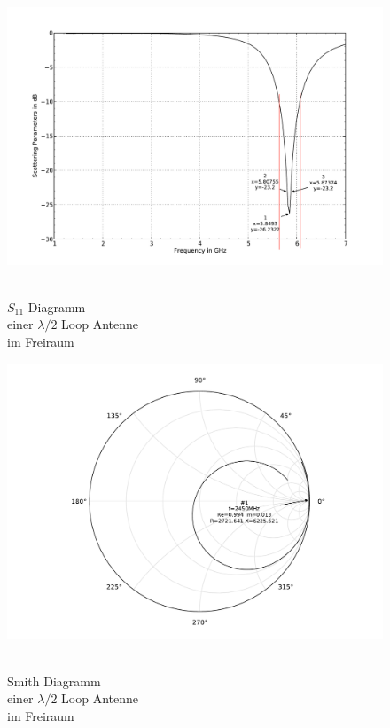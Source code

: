 \begin{figure}[!h]
\begin{center}
  \includegraphics[width=\linewidth]{content/bilder/Evaluation/Loop/L2/ohneABS/S11_Loop_Lambda2_ohneABS.pdf}
  \caption{\\$S_{11}$ Diagramm \\einer $\lambda/2$ Loop Antenne \\ im Freiraum}\label{fig:S11_Loop_Lambda2_freiraum_1}
\endminipage%
{}
  \includegraphics[width=\linewidth]{content/bilder/Evaluation/Loop/L2/ohneABS/Smith_Loop_Lambda2_ohneABS.pdf}
  \caption{\\Smith Diagramm \\einer $\lambda/2$ Loop Antenne \\ im Freiraum}\label{fig:Smith_Loop_Lambda2_freiraum_2}
\endminipage
\end{center}
\end{figure}
